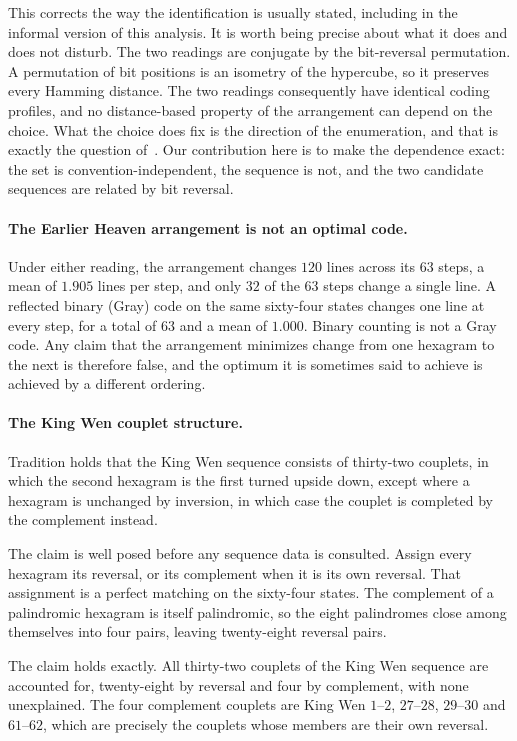 \documentclass[11pt,a4paper]{article}
\begin{document}
This corrects the way the identification is usually stated, including in the
informal version of this analysis. It is worth being precise about what it does
and does not disturb. The two readings are conjugate by the
bit-reversal permutation. A permutation of bit positions is an isometry of the
hypercube, so it preserves every Hamming distance. The two readings consequently
have identical coding profiles, and no distance-based property of the
arrangement can depend on the choice. What the choice does fix is the direction
of the enumeration, and that is exactly the question
of~\cite{maitre2023fuxi}. Our contribution here is to make the dependence exact:
the set is convention-independent, the sequence is not, and the two candidate
sequences are related by bit reversal.

\paragraph{The Earlier Heaven arrangement is not an optimal code.}
Under either reading, the arrangement changes $120$ lines across its $63$ steps,
a mean of $1.905$ lines per step, and only $32$ of the $63$ steps change a single
line. A reflected binary (Gray) code on the same sixty-four states changes one
line at every step, for a total of $63$ and a mean of $1.000$. Binary counting is
not a Gray code. Any claim that the arrangement minimizes change from one
hexagram to the next is therefore false, and the optimum it is sometimes said to
achieve is achieved by a different ordering.

\paragraph{The King Wen couplet structure.}
Tradition holds that the King Wen sequence consists of thirty-two couplets, in
which the second hexagram is the first turned upside down, except where a
hexagram is unchanged by inversion, in which case the couplet is completed by
the complement instead.

The claim is well posed before any sequence data is consulted. Assign every
hexagram its reversal, or its complement when it is its own reversal. That
assignment is a perfect matching on the sixty-four states. The complement of a
palindromic hexagram is itself palindromic, so the eight palindromes close among
themselves into four pairs, leaving twenty-eight reversal pairs.

The claim holds exactly. All thirty-two couplets of the King Wen sequence are
accounted for, twenty-eight by reversal and four by complement, with none
unexplained. The four complement couplets are King Wen $1$--$2$, $27$--$28$,
$29$--$30$ and $61$--$62$, which are precisely the couplets whose members are
their own reversal.
\end{document}

